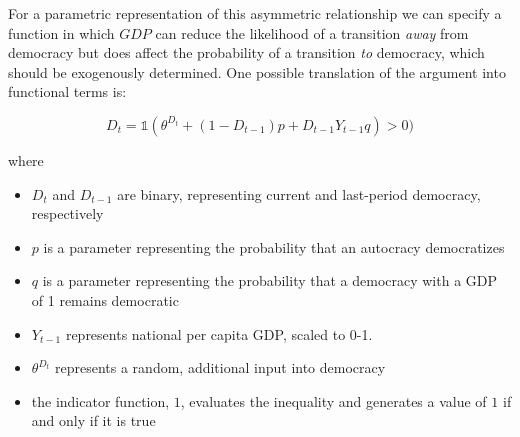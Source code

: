 \documentclass[
  12pt,
]{book}
\providecommand{\tightlist}{%
  \setlength{\itemsep}{0pt}\setlength{\parskip}{0pt}}
\begin{document}
For a parametric representation of this asymmetric relationship we can specify a function in which \(GDP\) can reduce the likelihood of a transition \emph{away} from democracy but does affect the probability of a transition \emph{to} democracy, which should be exogenously determined. One possible translation of the argument into functional terms is:

\[D_t = \mathbb{1}(\theta^{D_t} + (1-D_{t-1})p + D_{t-1}Y_{t-1}q) > 0)\]

where

\begin{itemize}
\tightlist
\item
  \(D_t\) and \(D_{t-1}\) are binary, representing current and last-period democracy, respectively
\item
  \(p\) is a parameter representing the probability that an autocracy democratizes
\item
  \(q\) is a parameter representing the probability that a democracy with a GDP of 1 remains democratic
\item
  \(Y_{t-1}\) represents national per capita GDP, scaled to 0-1.
\item
  \(\theta^{D_t}\) represents a random, additional input into democracy
\item
  the indicator function, \({1}\), evaluates the inequality and generates a value of \(1\) if and only if it is true
\end{itemize}
\end{document}
